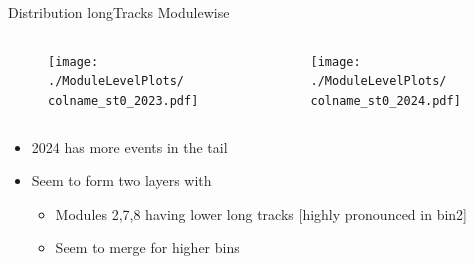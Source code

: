 \begin{frame}{Distribution longTracks Modulewise}
    \newcommand{\colname}{longTracks}
    \begin{columns}
        \begin{column}{0.6\linewidth}
            \begin{figure}
                \centering
                \texttt{[image: ./ModuleLevelPlots/\\colname\_st0\_2023.pdf]}
            \end{figure}
        \end{column}
        \begin{column}{0.6\linewidth}
            \begin{figure}
                \centering
                \texttt{[image: ./ModuleLevelPlots/\\colname\_st0\_2024.pdf]}
            \end{figure}
        \end{column}
    \end{columns}
    \begin{itemize}
        \item 2024 has more events in the tail
        \item Seem to form two layers with 
        \begin{itemize}
            \item Modules 2,7,8 having lower long tracks [highly pronounced in bin2]
            \item Seem to merge for higher bins
        \end{itemize}
    \end{itemize}
\end{frame}

